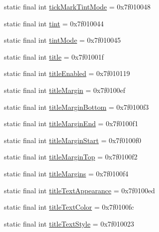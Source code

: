 \begin{CompactItemize}
\item 
static final int \hyperlink{classandroid_1_1support_1_1v7_1_1palette_1_1_r_1_1attr_b4d7297245cc06e93414a475c1c196a2}{tickMarkTintMode} = 0x7f010048
\item 
static final int \hyperlink{classandroid_1_1support_1_1v7_1_1palette_1_1_r_1_1attr_998980588dcead504839a8e7b7f066dc}{tint} = 0x7f010044
\item 
static final int \hyperlink{classandroid_1_1support_1_1v7_1_1palette_1_1_r_1_1attr_586358132d33c48b901e981806aced73}{tintMode} = 0x7f010045
\item 
static final int \hyperlink{classandroid_1_1support_1_1v7_1_1palette_1_1_r_1_1attr_e03514d819a921a90e18c93f1de75959}{title} = 0x7f01001f
\item 
static final int \hyperlink{classandroid_1_1support_1_1v7_1_1palette_1_1_r_1_1attr_eff1fe92594a95be73ec1777cb23c360}{titleEnabled} = 0x7f010119
\item 
static final int \hyperlink{classandroid_1_1support_1_1v7_1_1palette_1_1_r_1_1attr_f3b8f468f83893ba1743446a8f0e8bea}{titleMargin} = 0x7f0100ef
\item 
static final int \hyperlink{classandroid_1_1support_1_1v7_1_1palette_1_1_r_1_1attr_258df0951fef6117ddd10d18dd1c796e}{titleMarginBottom} = 0x7f0100f3
\item 
static final int \hyperlink{classandroid_1_1support_1_1v7_1_1palette_1_1_r_1_1attr_39e2b92299203c895866d133099914aa}{titleMarginEnd} = 0x7f0100f1
\item 
static final int \hyperlink{classandroid_1_1support_1_1v7_1_1palette_1_1_r_1_1attr_37f631d103ec1b0fe455c0d22d539d79}{titleMarginStart} = 0x7f0100f0
\item 
static final int \hyperlink{classandroid_1_1support_1_1v7_1_1palette_1_1_r_1_1attr_417174c3bf18c117ed59c9a06e31cb2d}{titleMarginTop} = 0x7f0100f2
\item 
static final int \hyperlink{classandroid_1_1support_1_1v7_1_1palette_1_1_r_1_1attr_b0d87fab2a360fd3189cc45236139025}{titleMargins} = 0x7f0100f4
\item 
static final int \hyperlink{classandroid_1_1support_1_1v7_1_1palette_1_1_r_1_1attr_7d5c437fe6990cd124d231fceb339407}{titleTextAppearance} = 0x7f0100ed
\item 
static final int \hyperlink{classandroid_1_1support_1_1v7_1_1palette_1_1_r_1_1attr_cf3b86608c6a3cf645990abf679d8c2a}{titleTextColor} = 0x7f0100fc
\item 
static final int \hyperlink{classandroid_1_1support_1_1v7_1_1palette_1_1_r_1_1attr_b8e1307bcb1b555e87a01d90cf492a1d}{titleTextStyle} = 0x7f010023

\end{CompactItemize}

